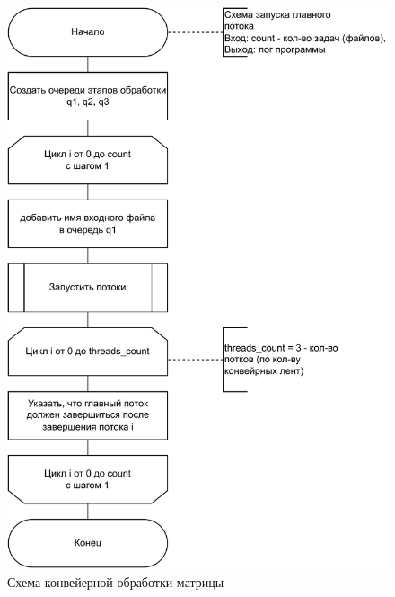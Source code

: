 \begin{figure}[h!]
	\centering
	\includegraphics[width=0.78\linewidth]{img/parallel}
	\caption{Схема конвейерной обработки матрицы}
	\label{fig:parallel}
\end{figure}

